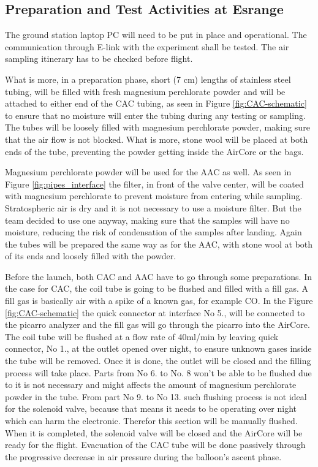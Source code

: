 \subsection{Preparation and Test Activities at Esrange}
The ground station laptop PC will need to be put in place and operational. The communication through E-link with the experiment shall be tested. The air sampling itinerary has to be checked before flight.

What is more, in a preparation phase, short (7 cm) lengths of stainless steel tubing, will be filled with fresh magnesium perchlorate powder \cite{Karion} and will be attached to either end of the CAC tubing, as seen in Figure \ref{fig:CAC-schematic} to ensure that no moisture will enter the tubing during any testing or sampling. The tubes will be loosely filled with magnesium perchlorate powder, making sure that the air flow is not blocked. What is more, stone wool will be placed at both ends of the tube, preventing the powder getting inside the AirCore or the bags.

Magnesium perchlorate powder will be used for the AAC as well. As seen in Figure \ref{fig:pipes_interface} the filter, in front of the valve center, will be coated with magnesium perchlorate to prevent moisture from entering while sampling. Stratospheric air is dry and it is not necessary to use a moisture filter. But the team decided to use one anyway, making sure that the samples will have no moisture, reducing the risk of condensation of the samples after landing. Again the tubes will be prepared the same way as for the AAC, with stone wool at both of its ends and loosely filled with the powder.   

Before the launch, both CAC and AAC have to go through some preparations.
In the case for CAC, the coil tube is going to be flushed and filled with a fill gas. A fill gas is basically air with a spike of a known gas, for example CO. In the Figure  \ref{fig:CAC-schematic} the quick connector at interface No 5., will be connected to the picarro analyzer and the fill gas will go through the picarro into the AirCore. The coil tube will be flushed at a flow rate of 40ml/min by leaving quick connector, No 1., at the outlet opened over night, to ensure unknown gases inside the tube will be removed. Once it is done, the outlet will be closed and the filling process will take place. Parts from No 6. to No. 8 won't be able to be flushed due to it is not necessary and might affects the amount of magnesium perchlorate powder in the tube. From part No 9. to No 13. such flushing process is not ideal for the solenoid valve, because that means it needs to be operating over night which can harm the electronic. Therefor this section will be manually flushed. When it is completed, the solenoid valve will be closed and the AirCore will be ready for the flight. Evacuation of the CAC tube will be done passively through the progressive decrease in air pressure during the balloon's ascent phase.

